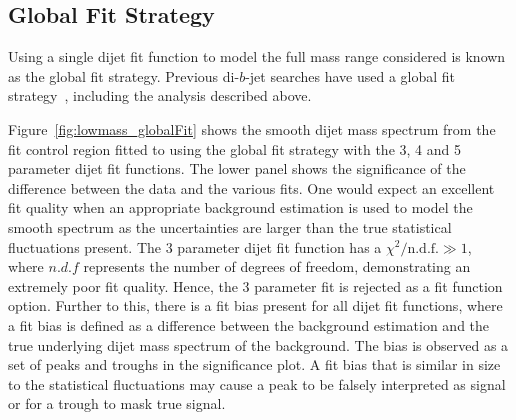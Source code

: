 


\subsection{Global Fit Strategy}
\label{sec:bkg-full_globalFit}

Using a single dijet fit function to model the full mass range considered is known as the global fit strategy.
Previous di-$b$-jet searches have used a global fit strategy~\cite{dibjet-mori16_paper}, including the \summer{} analysis described above.


Figure~\ref{fig:lowmass_globalFit} shows the smooth dijet mass spectrum from the fit control region
fitted to using the global fit strategy with the 3, 4 and 5 parameter dijet fit functions.
The lower panel shows the significance of the difference between the data and the various fits.
One would expect an excellent fit quality when an appropriate background estimation is used
to model the smooth spectrum as the uncertainties are larger than the true statistical fluctuations present.
The 3 parameter dijet fit function has a $\chi^{2}/\text{n.d.f.} \gg 1$,
where $n.d.f$ represents the number of degrees of freedom, demonstrating an extremely poor fit quality.
Hence, the 3 parameter fit is rejected as a fit function option.
Further to this, there is a fit bias present for all dijet fit functions,
where a fit bias is defined as a difference between the background estimation and the true underlying dijet mass spectrum of the background.
The bias is observed as a set of peaks and troughs in the significance plot.
A fit bias that is similar in size to the statistical fluctuations
may cause a peak to be falsely interpreted as signal or for a trough to mask true signal.

